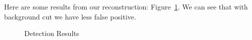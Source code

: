 \documentclass[a4paper]{article}
\begin{document}
\begin{enumerate}
\begin{itemize}
Here are some results from our reconstruction: Figure~\ref{fig:detector}. We can see that with background cut we have less false positive.
\begin{figure}[htb]
    \begin{center}
    \end{center}
    \caption{Detection Results}
    \label{fig:detector}
\end{figure}


\end{itemize}
\end{enumerate}
\end{document}
